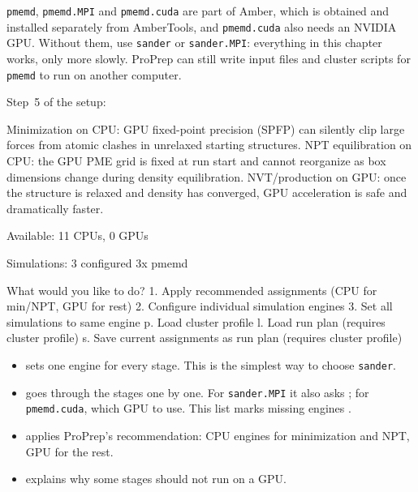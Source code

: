 \begin{needsoftware}
\texttt{pmemd}, \texttt{pmemd.MPI} and \texttt{pmemd.cuda} are part of Amber,
which is obtained and installed separately from AmberTools, and
\texttt{pmemd.cuda} also needs an NVIDIA GPU. Without them, use
\texttt{sander} or \texttt{sander.MPI}: everything in this chapter works, only
more slowly. ProPrep can still write input files and cluster scripts for
\texttt{pmemd} to run on another computer.
\end{needsoftware}

Step~5 of the setup:

\begin{screen}
  Minimization on CPU: GPU fixed-point precision (SPFP) can silently clip
  large forces from atomic clashes in unrelaxed starting structures.
  NPT equilibration on CPU: the GPU PME grid is fixed at run start and
  cannot reorganize as box dimensions change during density equilibration.
  NVT/production on GPU: once the structure is relaxed and density has
  converged, GPU acceleration is safe and dramatically faster.

  Available: 11 CPUs, 0 GPUs

  Simulations: 3 configured
    3x pmemd

What would you like to do?
   1. Apply recommended assignments (CPU for min/NPT, GPU for rest)
   2. Configure individual simulation engines
   3. Set all simulations to same engine
   p. Load cluster profile
   l. Load run plan (requires cluster profile)
   s. Save current assignments as run plan (requires cluster profile)
\end{screen}

\begin{itemize}
  \item {} sets one engine for every stage. This is the simplest way to
        choose \texttt{sander}.
  \item {} goes through the stages one by one. For \texttt{sander.MPI}
        it also asks ; for
        \texttt{pmemd.cuda}, which GPU to use. This list marks missing
        engines .
  \item {} applies ProPrep's recommendation: CPU engines for
        minimization and NPT, GPU for the rest.
  \item {} explains why some stages should not run on a GPU.
\end{itemize}

